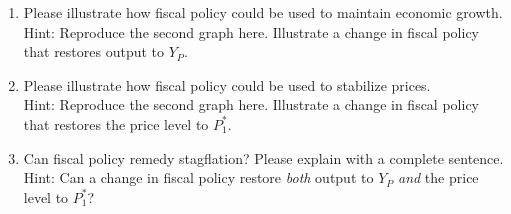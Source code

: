 \documentclass{assignment}
\begin{document}
\begin{enumerate}

\item \label{maintain-output} Please illustrate how fiscal policy could be used to maintain economic growth. \\ {\footnotesize Hint: Reproduce the second graph here. Illustrate a change in fiscal policy that restores output to $Y_P$.}

\vfill

\item \label{maintain-prices} Please illustrate how fiscal policy could be used to stabilize prices. \\ {\footnotesize Hint: Reproduce the second graph here. Illustrate a change in fiscal policy that restores the price level to $P^*_1$.}

\vfill

\item Can fiscal policy remedy stagflation? Please explain with a complete sentence.  \\ {\footnotesize Hint: Can a change in fiscal policy restore \emph{both} output to $Y_P$ \emph{and} the price level to $P^*_1$?}

\vspace{2\baselineskip}

\end{enumerate}
\end{document}
